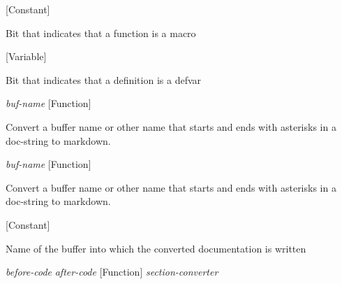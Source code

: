 \vspace{1em}
\noindent
{}
\usebox{\funcname}
 \hfill [Constant]

\begin{doc-string}
Bit that indicates that a function is a macro
\end{doc-string}

\vspace{1em}
\noindent
{}
\usebox{\funcname}
 \hfill [Variable]

\begin{doc-string}
Bit that indicates that a definition is a defvar
\end{doc-string}

\vspace{1em}
\noindent
{}
\usebox{\funcname}\emph{buf-name}
 \hfill [Function]

\begin{doc-string}
Convert a buffer name or other name that starts and ends with asterisks
 in a doc-string to markdown.
\end{doc-string}

\vspace{1em}
\noindent
{}
\usebox{\funcname}\emph{buf-name}
 \hfill [Function]

\begin{doc-string}
Convert a buffer name or other name that starts and ends with asterisks
 in a doc-string to markdown.
\end{doc-string}

\vspace{1em}
\noindent
{}
\usebox{\funcname}
 \hfill [Constant]

\begin{doc-string}
Name of the buffer into which the converted documentation is written
\end{doc-string}

\vspace{1em}
\noindent
{}
\usebox{\funcname}\emph{before-code} \emph{after-code}
 \hfill [Function]
\hspace*{\wd\funcname}\emph{section-converter}

